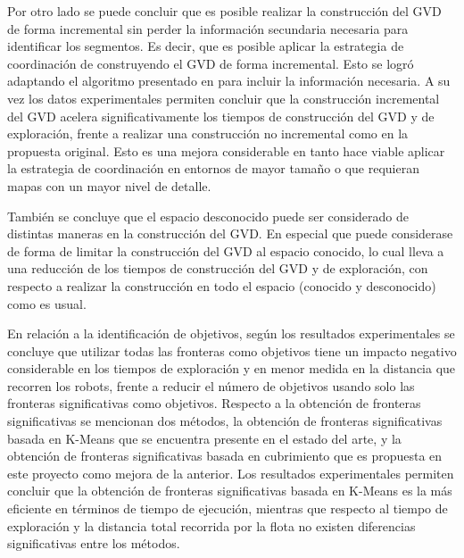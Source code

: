 Por otro lado se puede concluir que es posible realizar la construcción del GVD
de forma incremental sin perder la información secundaria necesaria para
identificar los segmentos. Es decir, que es posible aplicar la estrategia de
coordinación de \cite{wurm2008coordinated} construyendo el GVD de forma
incremental. Esto se logró adaptando el algoritmo presentado en \cite{Lau2013}
para incluir la información necesaria. A su vez los datos experimentales permiten
concluir que la construcción incremental del GVD acelera significativamente los
tiempos de construcción del GVD y de exploración, frente a realizar una
construcción no incremental como en la propuesta original. Esto es una mejora
considerable en tanto hace viable aplicar la estrategia de coordinación en
entornos de mayor tamaño o que requieran mapas con un mayor nivel de detalle.


También se concluye que el espacio desconocido puede ser considerado de
distintas maneras en la construcción del GVD. En especial que puede considerase
de forma de limitar la construcción del GVD al espacio conocido, lo cual lleva
a una reducción de los tiempos de construcción del GVD y de exploración, con
respecto a realizar la construcción en todo el espacio (conocido y desconocido)
como es usual.




En relación a la identificación de objetivos, según los resultados
experimentales se concluye que utilizar todas las fronteras como objetivos
tiene un impacto negativo considerable en los tiempos de exploración y en menor
medida en la distancia que recorren los robots, frente a reducir el número de
objetivos usando solo las fronteras significativas como objetivos.
Respecto a la obtención de fronteras significativas se mencionan dos métodos, la
obtención de fronteras significativas basada en K-Means que se encuentra presente en el estado del
arte, y la obtención de fronteras significativas basada en cubrimiento que es propuesta en este proyecto como
mejora de la anterior. Los resultados experimentales permiten concluir que la
obtención de fronteras significativas basada en K-Means es la más eficiente en términos de tiempo de
ejecución, mientras que respecto al tiempo de exploración y la distancia total
recorrida por la flota no existen diferencias significativas entre los métodos.

